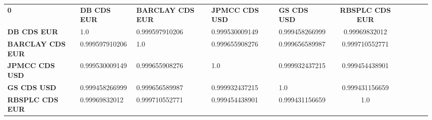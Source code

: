 \begin{tabular}{|l|l|l|l|l|c|c|c|c|c|}
\hline
\textbf{0} & \textbf{DB CDS EUR} & \textbf{BARCLAY CDS EUR} & \textbf{JPMCC CDS USD} & \textbf{GS CDS USD} & \textbf{RBSPLC CDS EUR}\\\hhline{|=|=|=|=|=|=|}
\textbf{DB CDS EUR} & 1.0 & 0.999597910206 & 0.999530009149 & 0.999458266999 & 0.99969832012\\
\textbf{BARCLAY CDS EUR} & 0.999597910206 & 1.0 & 0.999655908276 & 0.999656589987 & 0.999710552771\\
\textbf{JPMCC CDS USD} & 0.999530009149 & 0.999655908276 & 1.0 & 0.999932437215 & 0.999454438901\\
\textbf{GS CDS USD} & 0.999458266999 & 0.999656589987 & 0.999932437215 & 1.0 & 0.999431156659\\
\textbf{RBSPLC CDS EUR} & 0.99969832012 & 0.999710552771 & 0.999454438901 & 0.999431156659 & 1.0\\
\hline
\end{tabular}
